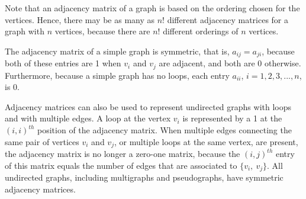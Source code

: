 \documentclass[11pt]{article}
\begin{document}
Note that an adjacency matrix of a graph is based on the ordering chosen for the vertices. Hence, there may be as many as $n!$ different adjacency matrices for a graph with $n$ vertices, because there are $n!$ different orderings of $n$ vertices.

The adjacency matrix of a simple graph is symmetric, that is, $a_{ij} = a_{ji}$, because both of these entries are 1 when $v_i$ and $v_j$ are adjacent, and both are 0 otherwise. Furthermore, because a simple graph has no loops, each entry $a_{ii}$, $i = 1, 2, 3, ..., n$, is 0.

Adjacency matrices can also be used to represent undirected graphs with loops and with multiple edges. A loop at the vertex $v_i$ is represented by a 1 at the $(i, i)^{th}$ position of the adjacency matrix. When multiple edges connecting the same pair of vertices $v_i$ and $v_j$, or multiple loops at the same vertex, are present, the adjacency matrix is no longer a zero-one matrix, because the $(i, j)^{th}$ entry of this matrix equals the number of edges that are associated to $\{v_i,\ v_j\}$. All undirected graphs, including multigraphs and pseudographs, have symmetric adjacency matrices.
\end{document}
